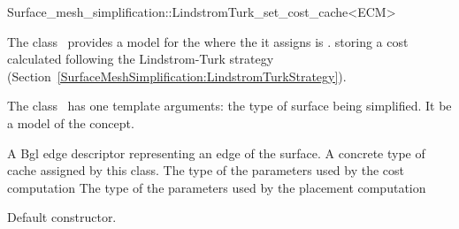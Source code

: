 

\begin{ccRefClass}{Surface_mesh_simplification::LindstromTurk_set_cost_cache<ECM>}


\ccDefinition

The class \ccRefName\ provides a model for the
 where the  it assigns is .
storing a cost calculated following the Lindstrom-Turk strategy
(Section~\ref{SurfaceMeshSimplification:LindstromTurkStrategy}).

The class \ccRefName\ has one template arguments: the type of surface being simplified. 
It be a model of the  concept.

\ccIsModel
{}


\ccTypes
  \ccGlue
  {A {\sc Bgl} edge descriptor representing an edge of the surface.}
  \ccGlue
  {A concrete type of cache assigned by this class.}
  \ccGlue
  {The type of the parameters used by the cost computation}
  \ccGlue
  {The type of the parameters used by the placement computation}
            
\ccCreation
{}  %

{Default constructor.}


\end{ccRefClass}
